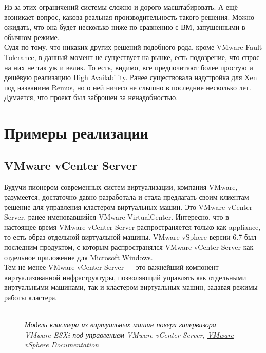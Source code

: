 \documentclass[14pt, a4paper]{article}
\begin{document}
Из-за этих ограничений системы сложно и дорого масштабировать. А ещё возникает вопрос, какова
реальная производительность такого решения. Можно ожидать, что она будет несколько ниже по
сравнению с ВМ, запущенными в обычном режиме.\\

Судя по тому, что никаких других решений подобного рода, кроме VMware Fault Tolerance, в данный
момент не существует на рынке, есть подозрение, что спрос на них не так уж и велик. То есть, видимо,
все предпочитают более простую и дешёвую реализацию High Availability. Ранее существовала
\href{https://wiki.xenproject.org/wiki/Remus}{надстройка для Xen под названием Remus}, но о ней ничего не слышно в последние несколько лет.
Думается, что проект был заброшен за ненадобностью.

\section*{Примеры реализации} 

\subsection*{VMware vCenter Server} 

Будучи пионером современных систем виртуализации, компания VMware, разумеется, достаточно
давно разработала и стала предлагать своим клиентам решение для управления кластером
виртуальных машин. Это VMware vCenter Server, ранее именовавшийся VMware VirtualCenter.
Интересно, что в настоящее время VMware vCenter Server распространяется только как appliance, то
есть образ отдельной виртуальной машины. VMware vSphere версии 6.7 был последним продуктом, с
которым распространялся VMware vCenter Server как отдельное приложение для Microsoft Windows.\\

Тем не менее VMware vCenter Server — это важнейший компонент виртуализованной
инфраструктуры, позволяющий управлять как отдельными виртуальными машинами, так и кластером
виртуальных машин, задавая режимы работы кластера.\\

\begin{figure}[h]
    \centering
    \\ 
    \small\textit{Модель кластера из виртуальных машин поверх гипервизора VMware ESXi под управлением VMware vCenter
    Server, \href{https://docs.vmware.com/en/VMware-vSphere/index.html}{VMware vSphere Documentation}}  
    \label{framework} 
\end{figure}
\end{document}
